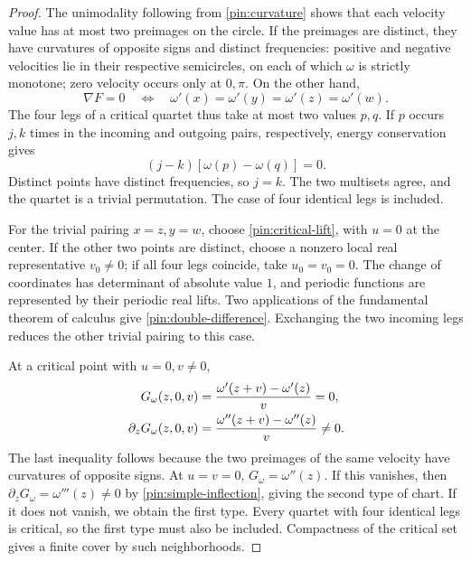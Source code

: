 \begin{proof}
The unimodality following from \eqref{pin:curvature} shows that each
velocity value has at most two preimages on the circle. If the preimages
are distinct, they have curvatures of opposite signs and distinct
frequencies: positive and negative velocities lie in their respective
semicircles, on each of which $\omega$ is strictly monotone; zero
velocity occurs only at $0,\pi$. On the other hand,
\begin{equation}
       \nabla F=0\quad\Longleftrightarrow\quad
       \omega'(x)=\omega'(y)=\omega'(z)=\omega'(w).
 \label{pin:critical-velocities}
\end{equation}
The four legs of a critical quartet thus take at most two values $p,q$.
If $p$ occurs $j,k$ times in the incoming and outgoing pairs,
respectively, energy conservation gives
\[
                    (j-k)[\omega(p)-\omega(q)]=0.
\]
Distinct points have distinct frequencies, so $j=k$. The two multisets
agree, and the quartet is a trivial permutation. The case of four
identical legs is included.

For the trivial pairing $x=z,y=w$, choose
\eqref{pin:critical-lift}, with $u=0$ at the center. If the other two
points are distinct, choose a nonzero local real representative
$v_0\ne0$; if all four legs coincide, take $u_0=v_0=0$. The change
of coordinates has determinant of absolute value $1$, and periodic
functions are represented by their periodic real lifts. Two applications
of the fundamental theorem of calculus give
\eqref{pin:double-difference}. Exchanging the two incoming legs reduces
the other trivial pairing to this case.

At a critical point with $u=0,v\ne0$,
\begin{align}
 G_\omega(z,0,v)&=\frac{\omega'(z+v)-\omega'(z)}{v}=0,\notag\\
 \partial_zG_\omega(z,0,v)
       &=\frac{\omega''(z+v)-\omega''(z)}{v}\ne0.
 \label{pin:separated-critical}
\end{align}
The last inequality follows because the two preimages of the same
velocity have curvatures of opposite signs. At $u=v=0$,
$G_\omega=\omega''(z)$. If this vanishes, then
$\partial_zG_\omega=\omega'''(z)\ne0$ by
\eqref{pin:simple-inflection}, giving the second type of chart. If it
does not vanish, we obtain the first type. Every quartet with four
identical legs is critical, so the first type must also be included.
Compactness of the critical set gives a finite cover by such
neighborhoods.
\end{proof}

